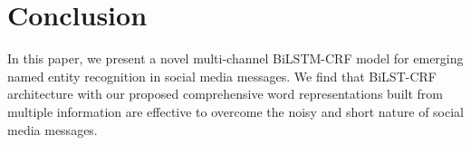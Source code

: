 \section{Conclusion}
In this paper, we present a novel multi-channel BiLSTM-CRF model for emerging named entity recognition in social media messages. 
We find that BiLST-CRF architecture with our proposed comprehensive word representations built from multiple information are effective to overcome the noisy and short nature of social media messages. 
